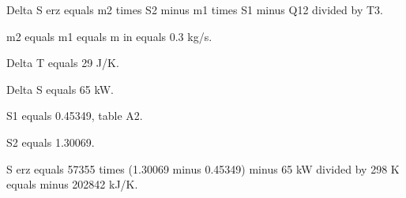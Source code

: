 Delta S erz equals m2 times S2 minus m1 times S1 minus Q12 divided by T3.  

m2 equals m1 equals m in equals 0.3 kg/s.  

Delta T equals 29 J/K.  

Delta S equals 65 kW.  

S1 equals 0.45349, table A2.  

S2 equals 1.30069.  

S erz equals 57355 times (1.30069 minus 0.45349) minus 65 kW divided by 298 K equals minus 202842 kJ/K.